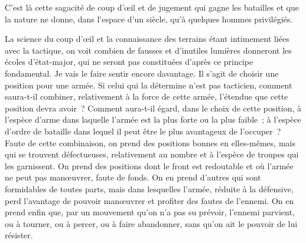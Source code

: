 \documentclass[french,twoside]{book} %
\begin{document}
C’est là cette sagacité de coup d’œil et de jugement qui gagne les batailles et que la nature ne donne, dans l’espace d’un siècle, qu’à quelques hommes privilégiés.\par
La science du coup d’œil et la connaissance des terrains étant intimement liées avec la tactique, on voit combien de fausses et d’inutiles lumières donneront les écoles d’état-major, qui ne seront pas constituées d’après ce principe fondamental. Je vais le faire sentir encore davantage. Il s’agit de choisir une position pour une armée. Si celui qui la détermine n’est pas tacticien, comment saura-t-il combiner, relativement à la force de cette armée, l’étendue que cette position devra avoir ? Comment aura-t-il égard, dans le choix de cette position, à l’espèce d’arme dans laquelle l’armée est la plus forte ou la plus faible ; à l’espèce d’ordre de bataille dans lequel il peut être le plus avantageux de l’occuper ? Faute de cette combinaison, on prend des positions bonnes en elles-mêmes, mais qui se trouvent défectueuses, relativement au nombre et à l’espèce de troupes qui les garnissent. On prend des positions dont le front est redoutable et où l’armée ne peut pas manœuvrer, faute de fonds. On en prend d’autres qui sont formidables de toutes parts, mais dans lesquelles l’armée, réduite à la défensive, perd l’avantage de pouvoir manœuvrer et profiter des fautes de l’ennemi. On en prend enfin que, par un mouvement qu’on n’a pas su prévoir, l’ennemi parvient, ou à tourner, ou à percer, ou à faire abandonner, sans qu’on ait le pouvoir de lui résister.\par
\end{document}
